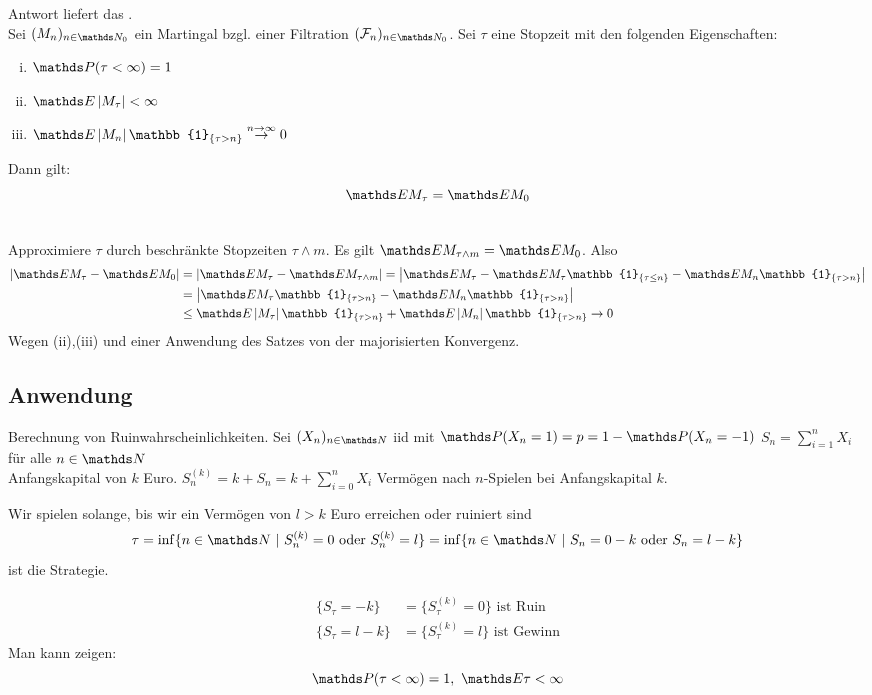Antwort liefert das .\\
Sei $(M_n)_{n\in \N_0}$ ein Martingal bzgl. einer Filtration $(\F_n)_{n\in \N_0}$. 
Sei $\tau$ eine Stopzeit mit den folgenden Eigenschaften:
\begin{enumerate}[(i)]
	\item $\Pw(\tau<\infty)=1$
	\item $\E\abs{M_\tau}<\infty$
	\item $\E\abs{M_n}\mathbb{1}_{\{\tau>n\}} \stackrel{n\to\infty}{\to}0$
\end{enumerate}
Dann gilt: 
\[
\E M_\tau=\E M_0 
\]

\\
Approximiere $\tau$ durch beschränkte Stopzeiten $\tau\land m$. 
Es gilt $\E M_{\tau\land m} =\E M_0$. 
Also 
\begin{equation*}
\begin{aligned}
	\abs{\E M_\tau-\E M_0}&=\abs{\E M_\tau-\E M_{\tau\land m}} =\abs{\E M_\tau-\E M_\tau\mathbb{1}_{\{\tau\le n\}}-\E M_n\mathbb{1}_{\{\tau> n\}}}\\
	&= \abs{\E M_\tau\mathbb{1}_{\{\tau> n\}}- \E M_n\mathbb{1}_{\{\tau >n\}}}\\
	&\le \E\abs{M_\tau}\mathbb{1}_{\{\tau> n\}}+ \E\abs{M_n}\mathbb{1}_{\{\tau>n\}} \to 0
\end{aligned}
\end{equation*}
Wegen (ii),(iii) und einer Anwendung des Satzes von der majorisierten Konvergenz.



\subsection{Anwendung}

Berechnung von Ruinwahrscheinlichkeiten. Sei $(X_n)_{n\in \N}$ iid mit $\Pw(X_n=1)=p=1-\Pw(X_n=-1)$ $S_n=\sum_{i=1}^{n} X_i$ für alle $n\in \N$\\
Anfangskapital von $k$ Euro. $S_n^{(k)}=k+S_n=k+\sum_{i=0}^{n} X_i$ Vermögen nach $n$-Spielen bei Anfangskapital $k$.

Wir spielen solange, bis wir ein Vermögen von $l>k$ Euro erreichen oder ruiniert sind 
\[
\tau=\inf\{n\in \N~|~S_n^{(k)}=0\text{ oder } S_n^{(k)}=l \} = \inf\{n\in \N~|~S_n=0-k\text{ oder } S_n=l-k \}
\]
ist die Strategie.

\begin{equation*}
\begin{aligned}
	\{S_\tau=-k\} &= \{S_\tau^{(k)}=0\} \text{ ist Ruin}\\
	\{S_\tau=l-k\} &= \{S_\tau^{(k)}=l\} \text{ ist Gewinn}
\end{aligned}
\end{equation*}
Man kann zeigen: 
\[
\Pw(\tau<\infty)=1,~\E \tau<\infty 
\]

